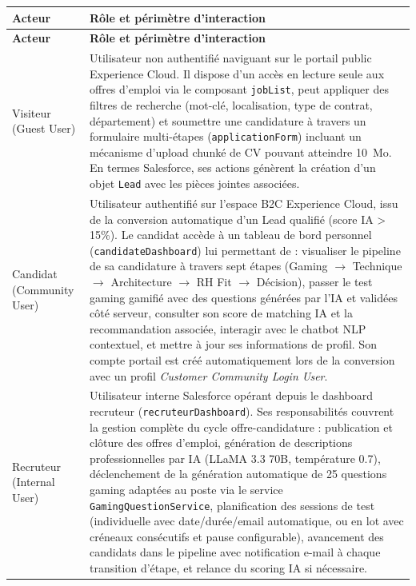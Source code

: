 \begin{longtable}{|p{4cm}|p{11cm}|}
\hline
\textbf{Acteur} & \textbf{Rôle et périmètre d'interaction} \\
\hline
\endfirsthead

\hline
\textbf{Acteur} & \textbf{Rôle et périmètre d'interaction} \\
\hline
\endhead

\endfoot

\hline
\endlastfoot

Visiteur (Guest User) & Utilisateur non authentifié naviguant sur le portail public Experience Cloud. Il dispose d'un accès en lecture seule aux offres d'emploi via le composant \texttt{jobList}, peut appliquer des filtres de recherche (mot-clé, localisation, type de contrat, département) et soumettre une candidature à travers un formulaire multi-étapes (\texttt{applicationForm}) incluant un mécanisme d'upload chunké de CV pouvant atteindre 10~Mo. En termes Salesforce, ses actions génèrent la création d'un objet \texttt{Lead} avec les pièces jointes associées. \\
\hline

Candidat (Community User) & Utilisateur authentifié sur l'espace B2C Experience Cloud, issu de la conversion automatique d'un Lead qualifié (score IA > 15\%). Le candidat accède à un tableau de bord personnel (\texttt{candidateDashboard}) lui permettant de : visualiser le pipeline de sa candidature à travers sept étapes (Gaming $\rightarrow$ Technique $\rightarrow$ Architecture $\rightarrow$ RH Fit $\rightarrow$ Décision), passer le test gaming gamifié avec des questions générées par l'IA et validées côté serveur, consulter son score de matching IA et la recommandation associée, interagir avec le chatbot NLP contextuel, et mettre à jour ses informations de profil. Son compte portail est créé automatiquement lors de la conversion avec un profil \textit{Customer Community Login User}. \\
\hline

Recruteur (Internal User) & Utilisateur interne Salesforce opérant depuis le dashboard recruteur (\texttt{recruteurDashboard}). Ses responsabilités couvrent la gestion complète du cycle offre-candidature : publication et clôture des offres d'emploi, génération de descriptions professionnelles par IA (LLaMA 3.3 70B, température 0.7), déclenchement de la génération automatique de 25 questions gaming adaptées au poste via le service \texttt{GamingQuestionService}, planification des sessions de test (individuelle avec date/durée/email automatique, ou en lot avec créneaux consécutifs et pause configurable), avancement des candidats dans le pipeline avec notification e-mail à chaque transition d'étape, et relance du scoring IA si nécessaire. \\
\hline


\end{longtable}
